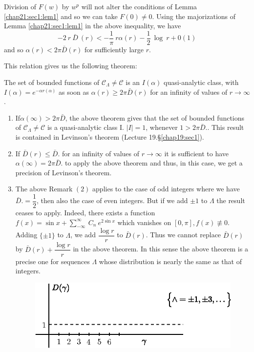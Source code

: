 Division of $F(w)$ by $w^p$ will not alter the conditions of Lemma
\ref{chap21:sec1:lem1} 
and so we can take $F(0) \neq 0$. Using the majorizations of Lemma
\ref{chap21:sec1:lem1} 
in the above inequality, we have 
$$
-2 ~ r ~ \bar{D} ~ (r) < - \frac{1}{\pi} ~ r\alpha(r) - \frac{1}{2}
~ \log ~ r + 0(1) 
$$
and so $\alpha (r) < 2 \pi\bar{D}(r)$ for sufficiently large $r$.

This relation gives us the following theorem:

\setcounter{theorem}{0}
\begin{theorem}\label{chap21:sec2:thm1}%
 The set of bounded functions of $\mathscr{C}_\Lambda \neq
 \mathscr{C}$ is an $I(\alpha)$ quasi-analytic class, with $I(\alpha)
 = e^{-\alpha r(\alpha)}$ as soon as $\alpha (r) \ge 2\pi\bar{D}(r)$
 for an infinity of values of $r \rightarrow \infty$. 
\end{theorem}

\begin{remarks*}%
 \begin{enumerate}[1)]
 \item If\pageoriginale $\alpha(\infty) > 2 \pi \bar{D}$, the above theorem gives
 that the set of bounded functions of $\mathscr{C}_\Lambda \neq
 \mathscr{C}$ is a quasi-analytic class I. $| I | = 1$, whenever $1
 > 2\pi\bar{D}$.. This result is contained in Levinson's theorem
 (Lecture 19.\S  \ref{chap19:sec1}). 
 \item If $\bar{D}(r) \le \bar{D}$. for an infinity of values of $r
 \rightarrow \infty$ it is sufficient to have $\alpha (\infty) =
 2\pi\bar{D}$. to apply the above theorem and thus, in this case,
 we get a precision of Levinson's theorem. 
 \item The above Remark $(2)$ applies to the case of odd integers
 where we have $\bar{D}. = \dfrac{1}{2}$, then also the case of
 even integers. But if we add $\pm 1 $ to $\Lambda$ the result
 ceases to apply. Indeed, there exists a function $f(x) = \sin x +
 \sum\limits_{- \infty}^{\infty} ~C_n ~ e^{2\sin x}$ which
 vanishes on $[0,\pi],f(x) \nequiv 0$. Adding $\{\pm 1 \}$ to
 $\Lambda$, we add $\dfrac{\log r}{r}$ to $\bar{D}(r)$. Thus we
 cannot replace $\bar{D}(r)$ by $\bar{D}(r) + \dfrac{\log r}{r}$ in
 the above theorem. In this sense the above theorem is a precise
 one for sequences $\Lambda$ whose distribution is nearly the same
 as that of integers. 
 \begin{figure}[H]
  \centerline{\includegraphics{vol15-figures/fig15-23.eps}}
 \end{figure}
 \end{enumerate}
\end{remarks*}

